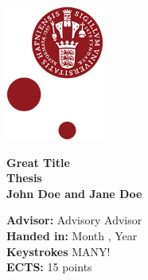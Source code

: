 
\begin{titlepage}
\begin{flushleft}
\end{flushleft}

\setlength{\columnsep}{0.5in}
\setcolumnwidth{4in, 1.07in}

\begin{paracol}{2}
    \begin{tcolorbox}[blanker, breakable, width=\linewidth]
    \vspace*{0.25in}
    \onehalfspacing
    \end{tcolorbox}
    \switchcolumn
    \begin{tcolorbox}[blanker, breakable, width=\linewidth]
        \hfill\includegraphics[width=1.27in]{99 graphics/KU-logo.png}
    \end{tcolorbox}
\end{paracol}

\vspace*{-0.93cm}
\noindent\textcolor{KUrod}{\makebox[\linewidth]{\rule{\paperwidth}{0.4pt}}} 

\begin{flushleft}
    \vspace{5cm}
    \Large \textbf{Great Title}\\

    \vspace{3cm}
    \Large \textbf{Thesis}\\
    \large \textbf{John Doe and Jane Doe}

\vfill
\normalsize
    \textbf{Advisor:} Advisory Advisor\\
    \textbf{Handed in:} Month , Year\\
    \textbf{Keystrokes} MANY! \\
    \textbf{ECTS:} 15 points
\end{flushleft}
\end{titlepage}
